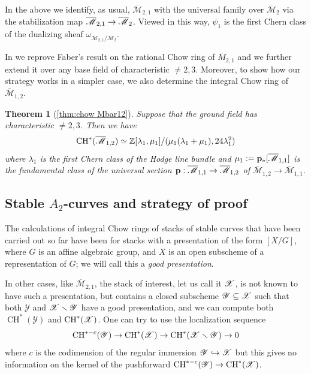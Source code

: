 \documentclass[a4paper, 10pt]{amsart}
\numberwithin{equation}{section}
\numberwithin{subsection}{section}
\newtheorem*{maintheorem}{Theorem}
\theoremstyle{definition}
\theoremstyle{remark}
\renewcommand{\mathcal}{\mathscr}
\newcommand\cM{\mathcal{M}} \newcommand\cN{\mathcal{N}}
\newcommand\cY{\mathcal{Y}} \newcommand\cZ{\mathcal{Z}}
\newcommand\arr{\ifinner\to\else\longrightarrow\fi}
\renewcommand{\setminus}{\smallsetminus}
\newcommand{\Mbar}{\overline{\cM}}
\newcommand{\ch}[1][*]{\operatorname{CH}^{#1}}
\begin{document}
	In the above we identify, as usual, $\Mbar_{2,1}$ with the universal family over $\Mbar_{2}$ via the stabilization map $\Mbar_{2,1} \arr \Mbar_{2}$. Viewed in this way, $\psi_{1}$ is the first Chern class of the dualizing sheaf $\omega_{\Mbar_{2,1}/\Mbar_{2}}$.
	
	In  we reprove Faber's result on the rational Chow ring of $\overline{M}_{2,1}$ and we further extend it over any base field of characteristic $\neq 2,3$. Moreover, to show how our strategy works in a simpler case, we also determine the integral Chow ring of $\Mbar_{1,2}$.
	\begin{maintheorem}[\ref{thm:chow Mbar12}]
		Suppose that the ground field has characteristic $\neq 2,3$. Then we have
		\[ \ch(\Mbar_{1,2}) \simeq \ZZ[\lambda_1,\mu_1]/(\mu_1(\lambda_1+\mu_1),24\lambda_1^2) \]
		where $\lambda_1$ is the first Chern class of the Hodge line bundle and $\mu_1:=\bfp_*[\Mbar_{1,1}]$ is the fundamental class of the universal section $\bfp:\Mbar_{1,1}\to\Mbar_{1,2}$ of $\Mbar_{1,2}\to\Mbar_{1,1}$.
	\end{maintheorem}
	
	\subsection*{Stable $A_2$-curves and strategy of proof}
	The calculations of integral Chow rings of stacks of stable curves that have been carried out so far have been for stacks with a presentation of the form $[X/G]$, where $G$ is an affine algebraic group, and $X$ is an open subscheme of a representation of $G$; we will call this a \emph{good presentation}.
	
	In other cases, like $\Mbar_{2,1}$, the stack of interest, let us call it $\cX$, is not known to have such a presentation, but contains a closed subscheme $\cY \subseteq \cX$ such that both $\cY$ and $\cX \setminus \cY$ have a good presentation, and we can compute both $\ch(\cY)$ and $\ch(\cX)$. One can try to use the localization sequence
	\[
	\operatorname{CH}^{*-c}(\cY) \arr \ch(\cX) \arr \ch(\cX \setminus \cY) \arr 0
	\]
	where $c$ is the codimension of the regular immersion $\cY \hookrightarrow \cX$ but this gives no information on the kernel of the pushforward $\operatorname{CH}^{*-c}(\cY) \arr \ch(\cX)$.
	
	
	
\end{document}
